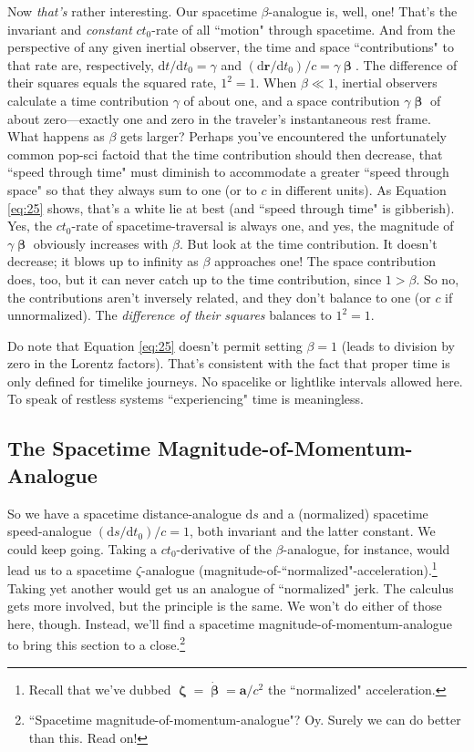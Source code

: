 \documentclass[12pt]{article}
\renewcommand{\vv}[1]{\mathbf{#1}}
\newcommand{\dd}[1]{\mathrm{d}#1}
\newcommand{\vvbeta}{\bm{\upbeta}}
\newcommand{\vvzeta}{\bm{\upzeta}}
\begin{document}
Now \emph{that's} rather interesting. Our spacetime $\beta$-analogue is, well, one! That's the invariant and \emph{constant} $c t_0$-rate of all ``motion" through spacetime. And from the perspective of any given inertial observer, the time and space ``contributions" to that rate are, respectively, $\dd t/ \dd t_0=\gamma$ and $(\dd \vv r / \dd t_0)/c = \gamma \vvbeta$. The difference of their squares equals the squared rate, $1^2 = 1$. When $\beta \ll 1$, inertial observers calculate a time contribution $\gamma$ of about one, and a space contribution $\gamma \vvbeta$ of about zero---exactly one and zero in the traveler's instantaneous rest frame. What happens as $\beta$ gets larger? Perhaps you've encountered the unfortunately common pop-sci factoid that the time contribution should then decrease, that ``speed through time" must diminish to accommodate a greater ``speed through space" so that they always sum to one (or to $c$ in different units). As Equation \ref{eq:25} shows, that's a white lie at best (and ``speed through time" is gibberish). Yes, the $ct_0$-rate of spacetime-traversal is always one, and yes, the magnitude of $\gamma \vvbeta$ obviously increases with $\beta$. But look at the time contribution. It doesn't decrease; it blows up to infinity as $\beta$ approaches one! The space contribution does, too, but it can never catch up to the time contribution, since $1>\beta$. So no, the contributions aren't inversely related, and they don't balance to one (or $c$ if unnormalized). The \emph{difference of their squares} balances to $1^2=1$.

Do note that Equation \ref{eq:25} doesn't permit setting $\beta=1$ (leads to division by zero in the Lorentz factors). That's consistent with the fact that proper time is only defined for timelike journeys. No spacelike or lightlike intervals allowed here. To speak of restless systems ``experiencing" time is meaningless.

\subsection{The Spacetime Magnitude-of-Momentum-Analogue}\label{ssec:pc}

So we have a spacetime distance-analogue $\dd s$ and a (normalized) spacetime speed-analogue $(\dd s/\dd t_0)/c=1$, both invariant and the latter constant. We could keep going. Taking a $c t_0$-derivative of the $\beta$-analogue, for instance, would lead us to a spacetime $\zeta$-analogue (magnitude-of-``normalized"-acceleration).\footnote{Recall that we've dubbed $\vvzeta = \dot{\vvbeta} = \vv a / c^2$ the ``normalized" acceleration.} Taking yet another would get us an analogue of ``normalized" jerk. The calculus gets more involved, but the principle is the same. We won't do either of those here, though. Instead, we'll find a spacetime magnitude-of-momentum-analogue to bring this section to a close.\footnote{``Spacetime magnitude-of-momentum-analogue"? Oy. Surely we can do better than this. Read on!}
\end{document}
